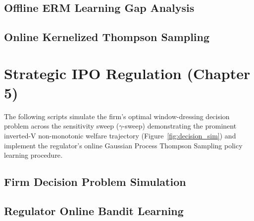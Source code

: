 \subsection{Offline ERM Learning Gap Analysis}
\label{subsec:code_reg_learning}


\subsection{Online Kernelized Thompson Sampling}
\label{subsec:code_online_learning}


\section{Strategic IPO Regulation (Chapter 5)}
\label{sec:code_ipo}

The following scripts simulate the firm's optimal window-dressing decision problem across the sensitivity sweep ($\gamma$-sweep) demonstrating the prominent inverted-V non-monotonic welfare trajectory (Figure~\ref{fig:decision_sim}) and implement the regulator's online Gaussian Process Thompson Sampling policy learning procedure.

\subsection{Firm Decision Problem Simulation}
\label{subsec:code_ipo_decision}


\subsection{Regulator Online Bandit Learning}
\label{subsec:code_ipo_learning}

